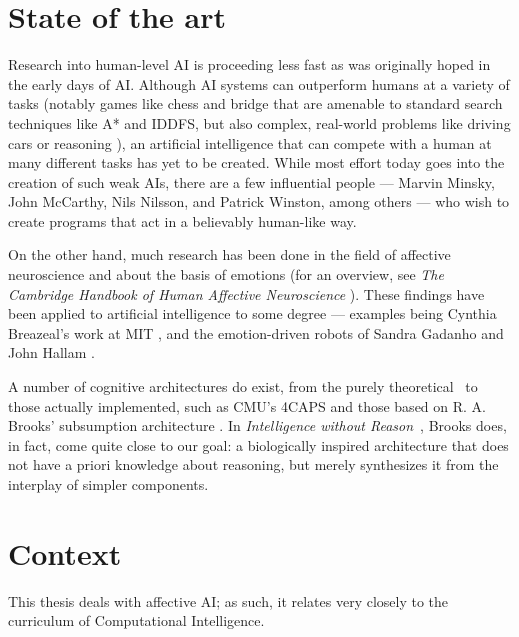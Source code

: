 \documentclass[bibliography=totoc ]{scrartcl}
\begin{document}
 
\section{State of the art}

Research into human-level AI is proceeding less fast as was originally hoped in the early days of AI. Although AI systems can outperform humans at a variety of tasks (notably games like chess and bridge \cite{Schaeffer00} that are amenable to standard search techniques like A* and IDDFS, but also complex, real-world problems like driving cars \cite{googleCar, googleCar2} or reasoning \cite{asp1, acthex}), an artificial intelligence that can compete with a human at many different tasks has yet to be created. While most effort today goes into the creation of such weak AIs, there are a few influential people --- Marvin Minsky, John McCarthy, Nils Nilsson, and Patrick Winston, among others \cite[p. 27]{norvig} --- who wish to create programs that act in a believably human-like way.

On the other hand, much research has been done in the field of affective neuroscience and about the basis of emotions (for an overview, see {\em The Cambridge Handbook of Human Affective Neuroscience} \cite{cambridgeAff}). These findings have been applied to artificial intelligence to some degree --- examples being Cynthia Breazeal's work at MIT \cite{kismet, breazeal2003}, and the emotion-driven robots of Sandra Gadanho and John Hallam \cite{DBLP:journals/adb/GadanhoH01}.

A number of cognitive architectures do exist, from the purely theoretical~\cite{emotionMachine} to those actually implemented, such as CMU's 4CAPS \cite{4caps} and those based on R. A. Brooks' subsumption architecture \cite{brooksSubsumption}. In {\em Intelligence without Reason}~\cite{Brooks91intelligencewithout}, Brooks does, in fact, come quite close to our goal: a biologically inspired architecture that does not have a priori knowledge about reasoning, but merely synthesizes it from the interplay of simpler components.

\section{Context}

This thesis deals with affective AI; as such, it relates very closely to the curriculum of Computational Intelligence.




\end{document}

